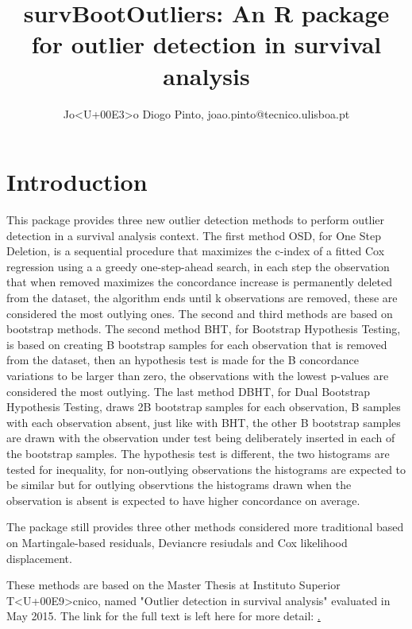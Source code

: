 \documentclass{article}
\begin{document}


\title{survBootOutliers: An R package for outlier detection in survival analysis}
\author{Jo<U+00E3>o Diogo Pinto, joao.pinto@tecnico.ulisboa.pt}

\maketitle

\tableofcontents

\section{Introduction}
This  package provides three new outlier detection methods to perform outlier detection in a survival analysis context. The first  method OSD, for One Step Deletion, is a sequential procedure that maximizes the c-index of a fitted Cox regression using a a greedy one-step-ahead search, in each step the observation that when removed maximizes the concordance increase is permanently deleted from the dataset, the algorithm ends until k observations are removed, these are considered the most outlying ones. The second and third methods are based on bootstrap methods. The second method BHT, for Bootstrap Hypothesis Testing, is based on creating B bootstrap samples for each observation that is removed from the dataset, then an hypothesis test is made for the B concordance variations to be larger than zero, the observations with the lowest p-values are considered the most outlying. The last method DBHT, for Dual Bootstrap Hypothesis Testing, draws 2B bootstrap samples for each observation, B samples with each observation absent, just like with BHT, the other B bootstrap samples are drawn with the observation under test being deliberately inserted in each of the bootstrap samples. The hypothesis test is different, the two histograms are tested for inequality, for non-outlying observations the histograms are expected to be similar but for outlying observtions the histograms drawn when the observation is absent is expected to have higher concordance on average.

The package still provides three other methods considered more traditional based on Martingale-based residuals, Deviancre resiudals and Cox likelihood displacement.

These methods are based on the Master Thesis at Instituto Superior T<U+00E9>cnico, named "Outlier detection in survival analysis" evaluated in May 2015. The link for the full text is left here for more detail:  \href{https://fenix.tecnico.ulisboa.pt/downloadFile/844820067124612/dissertacao.pdf}.
\end{document}
